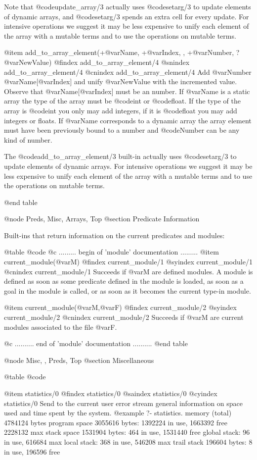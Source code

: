 {{{{{{{Note that @code{update_array/3} actually uses @code{setarg/3} to update
elements of dynamic arrays, and @code{setarg/3} spends an extra cell for
every update. For intensive operations we suggest it may be less
expensive to unify each element of the array with a mutable terms and
to use the operations on mutable terms.

@item add_to_array_element(+@var{Name}, +@var{Index}, , +@var{Number}, ?@var{NewValue}) 
@findex add_to_array_element/4
@snindex add_to_array_element/4
@cnindex add_to_array_element/4
Add @var{Number} @var{Name}[@var{Index}] and unify @var{NewValue} with
the incremented value. Observe that @var{Name}[@var{Index}] must be an
number. If @var{Name} is a static array the type of the array must be
@code{int} or @code{float}. If the type of the array is @code{int} you
only may add integers, if it is @code{float} you may add integers or
floats. If @var{Name} corresponds to a dynamic array the array element
must have been previously bound to a number and @code{Number} can be
any kind of number.

The @code{add_to_array_element/3} built-in actually uses
@code{setarg/3} to update elements of dynamic arrays. For intensive
operations we suggest it may be less expensive to unify each element
of the array with a mutable terms and to use the operations on mutable
terms.

@end table

@node Preds, Misc, Arrays, Top
@section Predicate Information

Built-ins that return information on the current predicates and modules:

@table @code
@c ......... begin of 'module' documentation .........
@item current_module(@var{M})
@findex current_module/1
@syindex current_module/1
@cnindex current_module/1
Succeeds if @var{M} are defined modules. A module is defined as soon as some
predicate defined in the module is loaded, as soon as a goal in the
module is called, or as soon as it becomes the current type-in module.

@item current_module(@var{M},@var{F})
@findex current_module/2
@syindex current_module/2
@cnindex current_module/2
Succeeds if @var{M} are current modules associated to the file @var{F}.

@c .......... end of 'module' documentation ..........
@end table

@node Misc, , Preds, Top
@section Miscellaneous

@table @code

@item statistics/0
@findex statistics/0
@saindex statistics/0
@cyindex statistics/0
Send to the current user error stream general information on space used and time
spent by the system.
@example
?- statistics.
memory (total)        4784124 bytes
   program space      3055616 bytes:    1392224 in use,      1663392 free
                                                             2228132  max
   stack space        1531904 bytes:        464 in use,      1531440 free
     global stack:                           96 in use,       616684  max
      local stack:                          368 in use,       546208  max
   trail stack         196604 bytes:          8 in use,       196596 free

}}}}}}}
